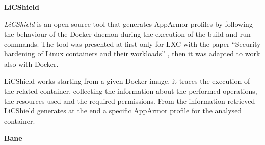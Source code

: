 \documentclass[a4paper,12pt]{article}
\begin{document}
\bigbreak\textbf{LiCShield}\bigbreak 

\textit{LiCShield} \cite{licshield} is an open-source tool that generates
AppArmor profiles by following the behaviour of the Docker daemon during the
execution of the build and run commands. The tool was presented at first only
for LXC with the paper ``Security hardening of Linux containers and their
workloads'' \cite{licshield_paper}, then it was adapted to work also with
Docker. \par LiCShield works starting from a given Docker image, it traces the
execution of the related container, collecting the information about the
performed operations, the resources used and the required permissions. From the
information retrieved LiCShield generates at the end a specific AppArmor profile
for the analysed container. 

\bigbreak\textbf{Bane}\bigbreak 
\end{document}
